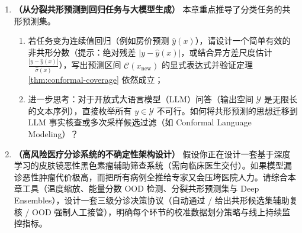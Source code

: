 \begin{enumerate}[label=\textbf{7.2.\arabic*}, start=7]
  \item \textbf{（从分裂共形预测到回归任务与大模型生成）} 本章重点推导了分类任务的共形预测集。
  \begin{enumerate}
    \item 若任务变为连续值回归（例如房价预测 $\hat{y}(x)$），请设计一个简单有效的非共形分数（提示：绝对残差 $|y - \hat{y}(x)|$，或结合异方差尺度估计 $\frac{|y - \hat{y}(x)|}{\hat{\sigma}(x)}$），写出预测区间 $\mathcal{C}(x_{\text{new}})$ 的显式表达式并验证定理 \ref{thm:conformal-coverage} 依然成立；
    \item 进一步思考：对于开放式大语言模型（LLM）问答（输出空间 $\mathcal{Y}$ 是无限长的文本序列），直接枚举所有 $y \in \mathcal{Y}$ 不可行。如何将共形预测的思想迁移到 LLM 事实核查或多次采样候选过滤（如 Conformal Language Modeling）？
  \end{enumerate}

  \item \textbf{（高风险医疗分诊系统的不确定性架构设计）} 假设你正在设计一套基于深度学习的皮肤镜恶性黑色素瘤辅助筛查系统（需向临床医生交付）。如果模型漏诊恶性肿瘤代价极高，而把所有病例全推给专家又会压垮医院人力。请综合本章工具（温度缩放、能量分数 OOD 检测、分裂共形预测集与 Deep Ensembles），设计一套三级分诊决策协议（自动通过 / 给出共形候选集辅助复核 / OOD 强制人工接管），明确每个环节的校准数据划分策略与线上持续监控指标。
\end{enumerate}
